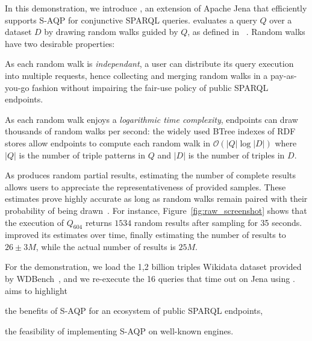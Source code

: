 In this demonstration, we introduce \NAME, an extension of Apache Jena
that efficiently supports S-AQP for conjunctive SPARQL queries. \NAME
evaluates a query $Q$ over a dataset $D$ by drawing random walks
guided by $Q$, as defined in \WANDER~\cite{li2019wanderjoin}. Random
walks have two desirable properties:
\begin{inparaenum}[(i)]
\item As each random walk is \emph{independant}, a user can distribute
  its query execution into multiple requests, hence collecting and
  merging random walks in a pay-as-you-go fashion without impairing
  the fair-use policy of public SPARQL endpoints.
\item As each random walk enjoys a \emph{logarithmic time complexity},
  endpoints can draw thousands of random walks per second: the widely
  used BTree indexes of RDF stores allow endpoints to compute each
  random walk in $\mathcal{O}(|Q| \log |D|)$ where $|Q|$ is the number
  of triple patterns in $Q$ and $|D|$ is the number of triples in $D$.
\end{inparaenum}
  
\noindent As \NAME produces random partial results, estimating the
number of complete results allows users to appreciate the
representativeness of provided samples. These estimates prove highly
accurate as long as random walks remain paired with their probability
of being drawn~\cite{DBLP:conf/sigmod/ParkKBKHH20}.
For instance, Figure~\ref{fig:raw_screenshot} shows that the execution of
$Q_{604}$ returns $1534$ random results after sampling for 35 seconds.
\NAME improved its estimates over time, finally estimating the number
of results to $26\pm 3M$, while the actual number of results is $25M$.


For the demonstration, we load the 1,2 billion triples Wikidata dataset 
provided by WDBench~\cite{angles2022wdbench}, and
we re-execute the 16 queries that time out on Jena using \NAME. %
%
\NAME aims to highlight
\begin{inparaenum}[(i)]
\item the benefits of S-AQP for an ecosystem of public SPARQL endpoints,
\item the feasibility of implementing S-AQP on well-known engines.
\end{inparaenum}


